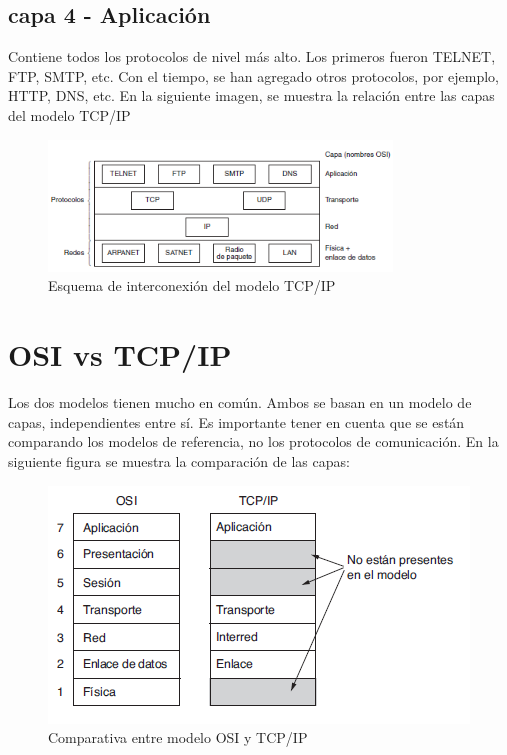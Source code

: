 \subsection{capa 4 - Aplicación}
Contiene todos los protocolos de nivel más alto. Los primeros fueron TELNET, FTP, SMTP, etc. Con el tiempo, se han agregado otros protocolos, por ejemplo, HTTP, DNS, etc. 
En la siguiente imagen, se muestra la relación entre las capas del modelo TCP/IP
\vspace{-0.4cm}
\begin{figure}[ht]
	\centering
	\includegraphics[width=0.7\linewidth,height=3.5cm]{cap_ap_tcpip}
	\caption{Esquema de interconexión del modelo TCP/IP}
\end{figure}


\section{OSI vs TCP/IP }

Los dos modelos tienen mucho en común. Ambos se basan en un modelo de capas, independientes entre sí. Es importante tener en cuenta que se están comparando los modelos de referencia, no los protocolos de comunicación. En la siguiente figura se muestra la comparación de las capas:  

\begin{figure}[ht]
	\centering 
	\includegraphics{comptcposi}
	\caption{Comparativa entre modelo OSI y TCP/IP}
	\label{fig:comp_tcposi}
\end{figure}

